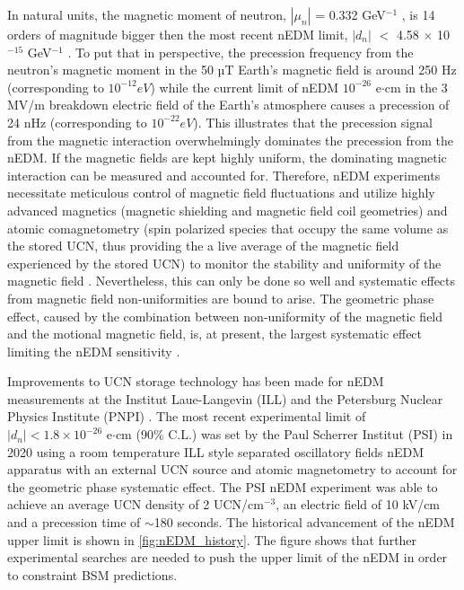 In natural units, the magnetic moment of neutron, $|\mu_n|$ = 0.332 GeV$^{-1}$ , is 14 orders of magnitude bigger then the most recent nEDM limit, $|d_n|$ $<$ 4.58 $\times$ 10$^{-15}$ GeV$^{-1}$ \cite{Codata2021, PDG2022}. To put that in perspective, the precession frequency from the neutron's magnetic moment in the 50 µT Earth’s magnetic field is around 250 Hz (corresponding to $10^{-12} eV$) while the current limit of nEDM $10^{-26}$ e$\cdot$cm in the 3 MV/m breakdown electric field of the Earth’s atmosphere causes a precession of 24 nHz (corresponding to $10^{-22} eV$). This illustrates that the precession signal from the magnetic interaction overwhelmingly dominates the precession from the nEDM. If the magnetic fields are kept highly uniform, the dominating magnetic interaction can be measured and accounted for. Therefore, nEDM experiments necessitate meticulous control of magnetic field fluctuations and utilize highly advanced magnetics (magnetic shielding and magnetic field coil geometries) and atomic comagnetometry (spin polarized species that occupy the same volume as the stored UCN, thus providing the a live average of the magnetic field experienced by the stored UCN) to monitor the stability and uniformity of the magnetic field \cite{Alarcon2022}. Nevertheless, this can only be done so well and systematic effects from magnetic field non-uniformities are bound to arise. The geometric phase effect, caused by the combination between non-uniformity of the magnetic field and the motional magnetic field, is, at present, the largest systematic effect limiting the nEDM sensitivity \cite{Pendlebury2004}.    

Improvements to UCN storage technology has been made for nEDM measurements at the Institut Laue-Langevin (ILL) \cite{Baker2006} and the Petersburg Nuclear Physics Institute (PNPI) \cite{Serebrov2014}. The most recent experimental limit  of $\mid d_n \mid < 1.8 \times 10^{-26}$ e$\cdot$cm (90\% C.L.) was set by the Paul Scherrer Institut (PSI) in 2020 \cite{Abel2020} using a room temperature ILL style separated oscillatory fields nEDM apparatus with an external UCN source and atomic magnetometry to account for the geometric phase systematic effect. The PSI nEDM experiment was able to achieve an average UCN density of 2 UCN/cm$^{-3}$, an electric field of 10 kV/cm and a precession time of $\sim$180 seconds. The historical advancement of the nEDM upper limit is shown in \cref{fig:nEDM_history}. The figure shows that further experimental searches are needed to push the upper limit of the nEDM in order to constraint BSM predictions.  

